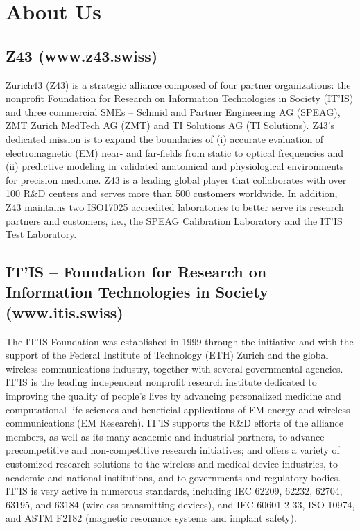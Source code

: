 \clearpage
\section{About Us}
\subsection*{Z43 (www.z43.swiss)}

Zurich43 (Z43) is a strategic alliance composed of four partner organizations: the nonprofit Foundation for Research on Information Technologies in Society (IT’IS) and three commercial SMEs – Schmid and Partner Engineering AG (SPEAG), ZMT Zurich MedTech AG (ZMT) and TI Solutions AG (TI Solutions). Z43’s dedicated mission is to expand the boundaries of (i) accurate evaluation of electromagnetic (EM) near- and far-fields from static to optical frequencies and (ii) predictive modeling in validated anatomical and physiological environments for precision medicine. Z43 is a leading global player that collaborates with over 100 R\&D centers and serves more than 500 customers worldwide. In addition, Z43 maintains two ISO17025 accredited laboratories to better serve its research partners and customers, i.e., the SPEAG Calibration Laboratory and the IT’IS Test Laboratory. 

\subsection*{IT’IS – Foundation for Research on Information Technologies in Society (www.itis.swiss)}
The IT’IS Foundation was established in 1999 through the initiative and with the support of the Federal Institute of Technology (ETH) Zurich and the global wireless communications industry, together with several governmental agencies. IT’IS is the leading independent nonprofit research institute dedicated to improving the quality of people’s lives by advancing personalized medicine and computational life sciences and beneficial applications of EM energy and wireless communications (EM Research). IT’IS supports the R\&D efforts of the alliance members, as well as its many academic and industrial partners, to advance precompetitive and non-competitive research initiatives; and offers a variety of customized research solutions to the wireless and medical device industries, to academic and national institutions, and to governments and regulatory bodies. IT'IS is very active in numerous standards, including IEC 62209, 62232, 62704, 63195, and 63184 (wireless transmitting devices), and IEC 60601-2-33, ISO 10974, and ASTM F2182 (magnetic resonance systems and implant safety).


